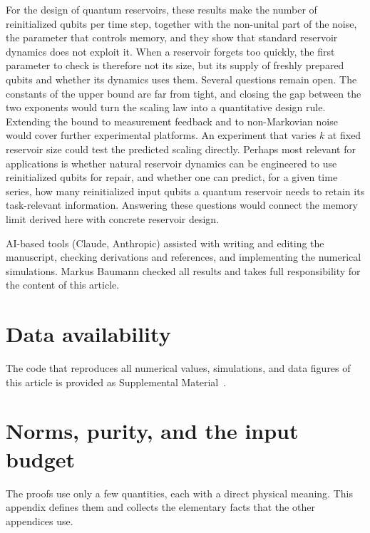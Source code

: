 \documentclass[aps,pra,reprint,superscriptaddress,floatfix]{revtex4-2}
\theoremstyle{plain}
\begin{document}
For the design of quantum reservoirs, these results make the number of reinitialized qubits per time step, together with the non-unital part of the noise, the parameter that controls memory, and they show that standard reservoir dynamics does not exploit it. When a reservoir forgets too quickly, the first parameter to check is therefore not its size, but its supply of freshly prepared qubits and whether its dynamics uses them. Several questions remain open. The constants of the upper bound are far from tight, and closing the gap between the two exponents would turn the scaling law into a quantitative design rule. Extending the bound to measurement feedback and to non-Markovian noise would cover further experimental platforms. An experiment that varies $k$ at fixed reservoir size could test the predicted scaling directly. Perhaps most relevant for applications is whether natural reservoir dynamics can be engineered to use reinitialized qubits for repair, and whether one can predict, for a given time series, how many reinitialized input qubits a quantum reservoir needs to retain its task-relevant information. Answering these questions would connect the memory limit derived here with concrete reservoir design.

\begin{acknowledgments}
AI-based tools (Claude, Anthropic) assisted with writing and editing the manuscript, checking derivations and references, and implementing the numerical simulations. Markus Baumann checked all results and takes full responsibility for the content of this article.
\end{acknowledgments}

\section*{Data availability}
The code that reproduces all numerical values, simulations, and data figures of this article is provided as Supplemental Material~\cite{SM}.

\appendix

\section{Norms, purity, and the input budget}
\label{app:norms}

The proofs use only a few quantities, each with a direct physical meaning. This appendix defines them and collects the elementary facts that the other appendices use.
\end{document}
